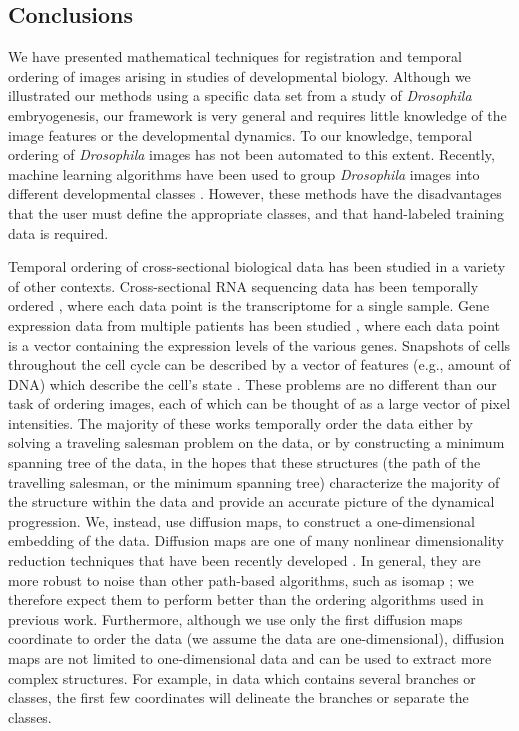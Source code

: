 \documentclass{pnastwo}
\begin{document}
\begin{article}
\section{Conclusions}

We have presented mathematical techniques for registration and temporal ordering of images arising in studies of developmental biology.
%
Although we illustrated our methods using a specific data set from a study of {\em Drosophila} embryogenesis, our framework is very general and requires little knowledge of the image features or the developmental dynamics.
%
To our knowledge, temporal ordering of {\em Drosophila} images has not been automated to this extent.
%
Recently, machine learning algorithms have been used to group {\em Drosophila} images into different developmental classes \cite{yuan2014automated}.
%
However, these methods have the disadvantages that the user must define the appropriate classes, and that hand-labeled training data is required.

Temporal ordering of cross-sectional biological data has been studied in a variety of other contexts.
%
Cross-sectional RNA sequencing data has been temporally ordered \cite{anavy2014blind}, where each data point is the transcriptome for a single sample.
%
Gene expression data from multiple patients has been studied \cite{gupta2008extracting} \cite{qiu2011discovering},
%
where each data point is a vector containing the expression levels of the various genes.
%
Snapshots of cells throughout the cell cycle can be described by a vector of features (e.g., amount of DNA) which describe the cell's state  \cite{kafri2013dynamics}.
%
These problems are no different than our task of ordering images, each of which can be thought of as a large vector of pixel intensities. 
%
The majority of these works temporally order the data either by solving a traveling salesman problem on the data, or by constructing a minimum spanning tree of the data, 
in the hopes that these structures (the path of the travelling salesman, or the minimum spanning tree) characterize the majority of the structure within the data and provide an accurate picture of the dynamical progression.
%
We, instead, use diffusion maps, to construct a one-dimensional embedding of the data.
%
Diffusion maps are one of many nonlinear dimensionality reduction techniques that have been recently developed \cite{Belkin2003} \cite{tenenbaum2000global} \cite{Donoho2003} \cite{Roweis2000}.
%
In general, they are more robust to noise than other path-based algorithms, such as isomap \cite{balasubramanian2002isomap}; we therefore expect them to perform better than the ordering algorithms used in previous work.
%
Furthermore, although we use only the first diffusion maps coordinate to order the data (we assume the data are one-dimensional), diffusion maps are not limited to one-dimensional data and can be used to extract more complex structures.
%
For example, in data which contains several branches or classes, the first few coordinates will delineate the branches or separate the classes.


\end{article}
\end{document}
